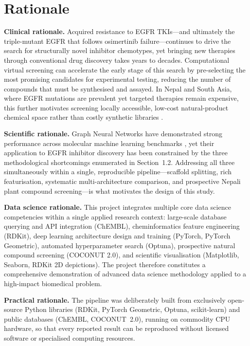 \section{Rationale}

\textbf{Clinical rationale.}
Acquired resistance to EGFR TKIs---and ultimately the triple-mutant EGFR that follows
osimertinib failure---continues to drive the search for structurally novel inhibitor
chemotypes, yet bringing new therapies through conventional drug discovery takes years
to decades. Computational virtual screening can accelerate the early stage of this
search by pre-selecting the most promising candidates for experimental testing,
reducing the number of compounds that must be synthesised and assayed. In Nepal and
South Asia, where EGFR mutations are prevalent yet targeted therapies remain expensive,
this further motivates screening locally accessible, low-cost natural-product chemical
space rather than costly synthetic libraries \parencite{rotow2023egfr}.

\textbf{Scientific rationale.}
Graph Neural Networks have demonstrated strong performance across molecular
machine learning benchmarks \parencite{hu2020strategies}, yet their application
to EGFR inhibitor discovery has been constrained by the three methodological
shortcomings enumerated in Section~1.2. Addressing all three simultaneously within a
single, reproducible pipeline---scaffold splitting, rich featurisation, systematic
multi-architecture comparison, and prospective Nepali plant compound screening---is
what motivates the design of this study.

\textbf{Data science rationale.}
This project integrates multiple core data science competencies within a single
applied research context: large-scale database querying and API integration (ChEMBL),
cheminformatics feature engineering (RDKit), deep learning architecture design and
training (PyTorch, PyTorch Geometric), automated hyperparameter search (Optuna),
prospective natural compound screening (COCONUT 2.0), and scientific visualisation
(Matplotlib, Seaborn, RDKit 2D depictions). The project therefore constitutes a comprehensive demonstration
of advanced data science methodology applied to a high-impact biomedical problem.

\textbf{Practical rationale.}
The pipeline was deliberately built from exclusively open-source Python libraries
(RDKit, PyTorch Geometric, Optuna, scikit-learn) and public databases (ChEMBL,
COCONUT~2.0), running on commodity CPU hardware, so that every reported result can be
reproduced without licensed software or specialised computing resources.

